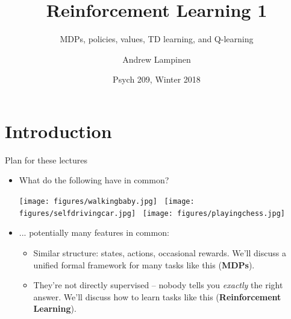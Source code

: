 \documentclass{beamer}
\begin{document}
\title{Reinforcement Learning 1}
\subtitle{MDPs, policies, values, TD learning, and Q-learning}
\author{Andrew Lampinen}
\date{Psych 209, Winter 2018}
\frame{\titlepage}


\section{Introduction}
\begin{frame}{Plan for these lectures}
\begin{itemize}
    \item What do the following have in common?
    \begin{center}
        \texttt{[image: figures/walkingbaby.jpg]}~
        \texttt{[image: figures/selfdrivingcar.jpg]}~
        \texttt{[image: figures/playingchess.jpg]}
    \end{center}
    \item<2-> ... potentially many features in common:
    \begin{itemize} 
        \item<3-> Similar structure: states, actions, occasional rewards. We'll discuss a unified formal framework for many tasks like this (\textbf{MDPs}). 
        \item<4-> They're not directly supervised -- nobody tells you \emph{exactly} the right answer. We'll discuss how to learn tasks like this (\textbf{Reinforcement Learning}). 
    \end{itemize}
\end{itemize}
\end{frame}
\end{document}
